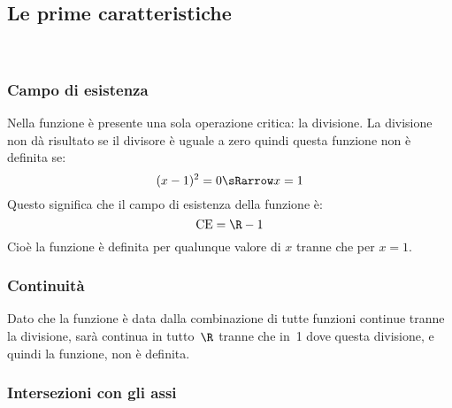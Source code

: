 
\subsection{Le prime caratteristiche}
\label{subsec:prime_caratteristiche}
\mbox{ }

\begin{minipage}{.60\linewidth}

\subsubsection{Campo di esistenza}
Nella funzione è presente una sola operazione critica: la divisione. La 
divisione non dà risultato se il divisore è uguale a zero quindi questa 
funzione non è definita se:
\[(x-1)^2 = 0 \sRarrow x=1\]
Questo significa che il campo di esistenza della funzione è:
\[\text{CE} = \R - {1}\]
Cioè la funzione è definita per qualunque valore di \(x\) tranne che per 
\(x=1\).

\subsubsection{Continuità}
Dato che la funzione è data dalla combinazione di tutte funzioni continue 
tranne la divisione, sarà continua in tutto~\(\R\) tranne che in~1 
dove questa divisione, e quindi la funzione, non è definita.

\end{minipage}
\hfill
\begin{minipage}{.38\linewidth}
 \begin{center}
\cefunzionea
 \end{center}
\end{minipage}


\subsubsection{Intersezioni con gli assi}
 
\mbox{ }

